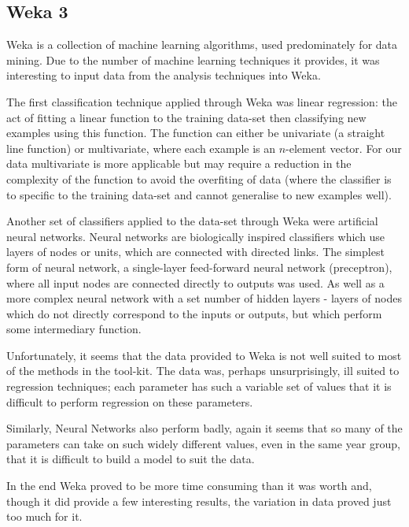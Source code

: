 \subsection{Weka 3}
Weka is a collection of machine learning algorithms\cite{Hall2009WEKA}, used predominately for
data mining. Due to the number of machine learning techniques it provides, it was interesting to
input data from the analysis techniques into Weka.

The first classification technique applied through Weka was linear 
regression\cite[p.717-727]{Russell2010Artificial}: the act of fitting a linear function to the 
training data-set then classifying new examples using this function. The function can either be
univariate (a straight line function) or multivariate, where each example is an $n$-element 
vector. For our data multivariate is more applicable but may require a reduction in the complexity
of the function to avoid the overfiting of data (where the classifier is to specific to the 
training data-set and cannot generalise to new examples well).

Another set of classifiers applied to the data-set through Weka were artificial neural 
networks\cite[p.727-737]{Russell2010Artificial}. Neural networks are biologically inspired 
classifiers which use layers of nodes or units, which are connected with directed links. The 
simplest form of neural network, a single-layer feed-forward neural network (preceptron), where
all input nodes are connected directly to outputs was used. As well as a more complex neural 
network with a set number of hidden layers - layers of nodes which do not directly correspond to
the inputs or outputs, but which perform some intermediary function.

Unfortunately, it seems that the data provided to Weka is not well suited to most of the methods 
in the tool-kit. The data was, perhaps unsurprisingly, ill suited to regression techniques; each
parameter has such a variable set of values that it is difficult to perform regression on these
parameters.

Similarly, Neural Networks also perform badly, again it seems that so many of the parameters can
take on such widely different values, even in the same year group, that it is difficult to build
a model to suit the data.

In the end Weka proved to be more time consuming than it was worth and, though it did provide a 
few interesting results, the variation in data proved just too much for it.

